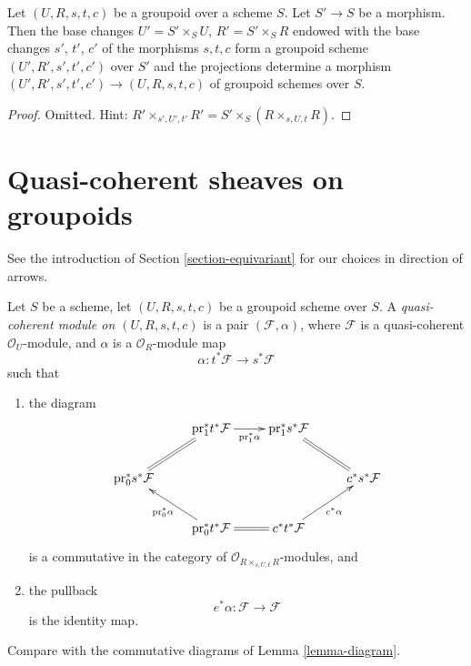 \begin{lemma}
\label{lemma-base-change-groupoid}
Let $(U, R, s, t, c)$ be a groupoid over a scheme $S$.
Let $S' \to S$ be a morphism. Then the base changes $U' = S' \times_S U$,
$R' = S' \times_S R$ endowed with the base changes $s'$, $t'$, $c'$
of the morphisms $s, t, c$ form a groupoid scheme
$(U', R', s', t', c')$ over $S'$ and the projections
determine a morphism
$(U', R', s', t', c') \to (U, R, s, t, c)$
of groupoid schemes over $S$.
\end{lemma}

\begin{proof}
Omitted. Hint:
$R' \times_{s', U', t'} R' = S' \times_S (R \times_{s, U, t} R)$.
\end{proof}









\section{Quasi-coherent sheaves on groupoids}
\label{section-groupoids-quasi-coherent}

\noindent
See the introduction of Section \ref{section-equivariant} for our
choices in direction of arrows.

\begin{definition}
\label{definition-groupoid-module}
Let $S$ be a scheme, let $(U, R, s, t, c)$ be a groupoid scheme over $S$.
A {\it quasi-coherent module on $(U, R, s, t, c)$}
is a pair $(\mathcal{F}, \alpha)$, where $\mathcal{F}$ is a quasi-coherent
$\mathcal{O}_U$-module, and $\alpha$ is a $\mathcal{O}_R$-module
map
$$
\alpha : t^*\mathcal{F} \longrightarrow s^*\mathcal{F}
$$
such that
\begin{enumerate}
\item the diagram
$$
\xymatrix{
& \text{pr}_1^*t^*\mathcal{F} \ar[r]_-{\text{pr}_1^*\alpha} &
\text{pr}_1^*s^*\mathcal{F} \ar@{=}[rd] & \\
\text{pr}_0^*s^*\mathcal{F} \ar@{=}[ru] & & & c^*s^*\mathcal{F} \\
& \text{pr}_0^*t^*\mathcal{F} \ar[lu]^{\text{pr}_0^*\alpha} \ar@{=}[r] &
c^*t^*\mathcal{F} \ar[ru]_{c^*\alpha}
}
$$
is a commutative in the category of
$\mathcal{O}_{R \times_{s, U, t} R}$-modules, and
\item the pullback
$$
e^*\alpha : \mathcal{F} \longrightarrow \mathcal{F}
$$
is the identity map.
\end{enumerate}
Compare with the commutative diagrams of Lemma \ref{lemma-diagram}.
\end{definition}

